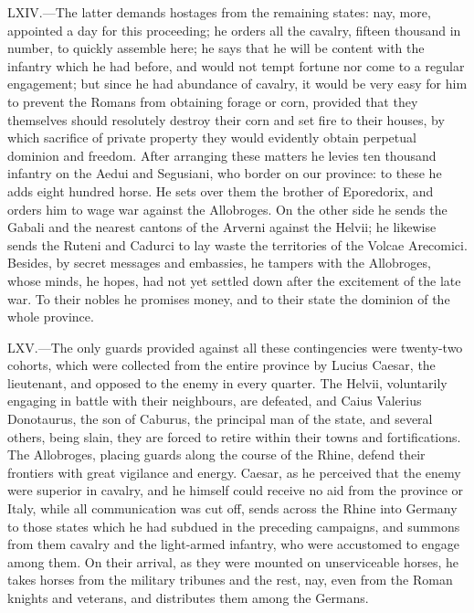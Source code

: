 LXIV.—The latter demands hostages from the remaining states: nay, more,
appointed a day for this proceeding; he orders all the cavalry, fifteen
thousand in number, to quickly assemble here; he says that he will be
content with the infantry which he had before, and would not tempt
fortune nor come to a regular engagement; but since he had abundance of
cavalry, it would be very easy for him to prevent the Romans from
obtaining forage or corn, provided that they themselves should
resolutely destroy their corn and set fire to their houses, by which
sacrifice of private property they would evidently obtain perpetual
dominion and freedom. After arranging these matters he levies ten
thousand infantry on the Aedui and Segusiani, who border on our
province: to these he adds eight hundred horse. He sets over them the
brother of Eporedorix, and orders him to wage war against the
Allobroges. On the other side he sends the Gabali and the nearest
cantons of the Arverni against the Helvii; he likewise sends the Ruteni
and Cadurci to lay waste the territories of the Volcae Arecomici.
Besides, by secret messages and embassies, he tampers with the
Allobroges, whose minds, he hopes, had not yet settled down after the
excitement of the late war. To their nobles he promises money, and to
their state the dominion of the whole province.

LXV.—The only guards provided against all these contingencies were
twenty-two cohorts, which were collected from the entire province by
Lucius Caesar, the lieutenant, and opposed to the enemy in every
quarter. The Helvii, voluntarily engaging in battle with their
neighbours, are defeated, and Caius Valerius Donotaurus, the son of
Caburus, the principal man of the state, and several others, being
slain, they are forced to retire within their towns and fortifications.
The Allobroges, placing guards along the course of the Rhine, defend
their frontiers with great vigilance and energy. Caesar, as he perceived
that the enemy were superior in cavalry, and he himself could receive no
aid from the province or Italy, while all communication was cut off,
sends across the Rhine into Germany to those states which he had subdued
in the preceding campaigns, and summons from them cavalry and the
light-armed infantry, who were accustomed to engage among them. On their
arrival, as they were mounted on unserviceable horses, he takes horses
from the military tribunes and the rest, nay, even from the Roman
knights and veterans, and distributes them among the Germans.

